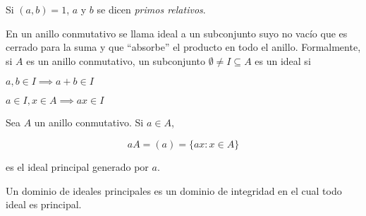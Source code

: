 \begin{ndef}
  Si $(a,b) = 1$, $a$ y $b$ se dicen \emph{primos relativos}.
\end{ndef}

\begin{ndef}[Ideal]
  En un anillo conmutativo se llama ideal a un subconjunto suyo no vacío que es cerrado para la suma y que ``absorbe'' el producto en todo
  el anillo. Formalmente, si $A$ es un anillo conmutativo, un subconjunto $\emptyset \not= I\subseteq A$ es un ideal si
	\begin{nlist}
		\item $a,b\in I \implies a+b\in I$
		\item $a\in I, x\in A \implies ax \in I$
	\end{nlist}
\end{ndef}

\begin{ndef}
  Sea $A$ un anillo conmutativo. Si $a\in A$,

  $$aA=(a)=\{ax: x\in A\}$$

  es el ideal principal generado por $a$.
\end{ndef}

\begin{ndef}
	Un dominio de ideales principales es un dominio de integridad en el cual todo ideal es principal.
\end{ndef}



